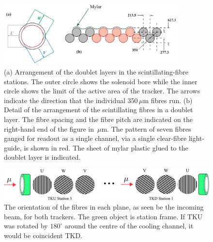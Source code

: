   \begin{figure}[tbh]
    \begin{center}
      \includegraphics[width=0.85\textwidth]{01-MICE/doublet-layer.pdf}
      \caption{\label{fig:DoubletLayer}(a) Arrangement of the doublet layers in the scintillating-fibre  stations. The outer circle shows the solenoid bore while the inner circle shows the limit of the active area of the tracker. The arrows indicate the direction that the individual 350\,$\mu$m fibres run. (b) Detail of the arrangement of the scintillating fibres in a doublet layer. The fibre spacing and the fibre pitch are indicated on the right-hand end of the figure in \,$\mu$m. The pattern of seven fibres ganged for readout as a single channel, via a single clear-fibre light-guide, is shown in red. The sheet of mylar plastic glued to the doublet layer is indicated. }
    \end{center}
  \end{figure}

  \begin{figure}[tbh]
    \centering
    \includegraphics[width=0.95\linewidth]{01-MICE/FibrePlaneOrientation.pdf} \hspace{2pc}%
    \caption{\label{fig:FibrePlaneOrientation} The orientation of the fibres in each plane, as seen be the incoming beam, for both trackers. The green object is station frame. If TKU was rotated by $180^\circ$ around the centre of the cooling channel, it would be coincident  TKD.}
  \end{figure}